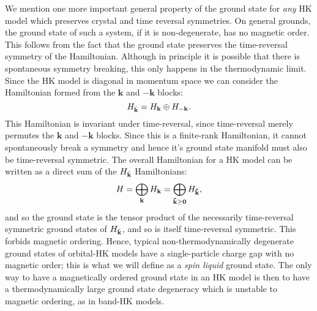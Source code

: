 \documentclass[prb,aps,amssymb,twocolumn,notitlepage]{revtex4-2}
\begin{document}
We mention one more important general property of the ground state for \textit{any} HK model which preserves crystal and time reversal symmetries. On general grounds, the ground state of such a system, if it is non-degenerate, has no magnetic order. This follows from the fact that the ground state preserves the time-reversal symmetry of the Hamiltonian. 
Although in principle it is possible that there is spontaneous symmetry breaking, this only happens in the thermodynamic limit. 
Since the HK model is diagonal in momentum space we can consider the Hamiltonian formed from the $\mathbf{k}$ and $-\mathbf{k}$ blocks:
\begin{equation}
    H_{\Tilde{\mathbf{k}}}=H_{\mathbf{k}}\oplus H_{-\mathbf{k}}.
\end{equation}
This Hamiltonian is invariant under time-reversal, since time-reversal merely permutes the $\mathbf{k}$ and $-\mathbf{k}$ blocks. 
Since this is a finite-rank Hamiltonian, it cannot spontaneously break a symmetry and hence it's ground state manifold must also be time-reversal symmetric. 
The overall Hamiltonian for a HK model can be written as a direct sum of the $H_{\Tilde{\mathbf{k}}}$ Hamiltonians:
\begin{equation}
H=\bigoplus_{\mathbf{k}}H_{\mathbf{k}}=\bigoplus_{\mathbf{\tilde{k}\geq 0}}H_{\mathbf{\Tilde{k}}},
\end{equation}
and so the ground state is the tensor product of the necessarily time-reversal symmetric ground states of $H_{\Tilde{\mathbf{k}}}$, and so is itself time-reversal symmetric. This forbids magnetic ordering.  Hence, typical non-thermodynamically degenerate ground states of orbital-HK models have a single-particle charge gap with no magnetic order; this is what we will define as a \textit{spin liquid} ground state. The only way to have a magnetically ordered ground state in an HK model is then to have a thermodynamically large ground state degeneracy which is unstable to magnetic ordering, as in band-HK models.
\end{document}
